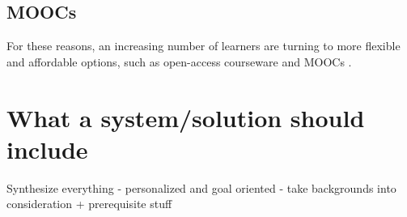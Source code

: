 \subsection{MOOCs}
For these reasons, an increasing number of learners are turning to more flexible and affordable options, such as open-access courseware and MOOCs \cite{harish:2013} \cite{papmpouri:2021}.

\section{What a system/solution should include}

Synthesize everything 
- personalized and goal oriented
- take backgrounds into consideration + prerequisite stuff 
